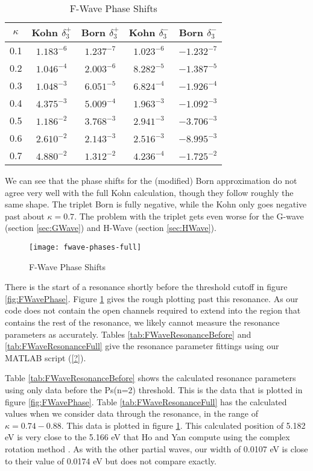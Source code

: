 \documentclass[Dissertation.tex]{subfiles}
\begin{document}
\setlength{\abovecaptionskip}{6pt}
\setlength{\belowcaptionskip}{6pt}
\begin{table}[H]
\centering
\begin{tabular}{c | c c | c c}
\toprule
$\kappa$ & Kohn $\delta_3^+$ & Born $\delta_3^+$ & Kohn $\delta_3^-$ & Born $\delta_3^-$ \\
\midrule
0.1 &	$1.183^{-6}$ & $1.237^{-7}$ & $1.023^{-6}$ & $-1.232^{-7}$ \\
0.2 &	$1.046^{-4}$ & $2.003^{-6}$ & $8.282^{-5}$ & $-1.387^{-5}$ \\
0.3 &	$1.048^{-3}$ & $6.051^{-5}$ & $6.824^{-4}$ & $-1.926^{-4}$ \\
0.4 &	$4.375^{-3}$ & $5.009^{-4}$ & $1.963^{-3}$ & $-1.092^{-3}$ \\
0.5 & $1.186^{-2}$ & $3.768^{-3}$ & $2.941^{-3}$ & $-3.706^{-3}$ \\
0.6 &	$2.610^{-2}$ & $2.143^{-3}$ & $2.516^{-3}$ & $-8.995^{-3}$ \\
0.7 &	$4.880^{-2}$ & $1.312^{-2}$ & $4.236^{-4}$ & $-1.725^{-2}$ \\
\bottomrule
\end{tabular}
\caption{F-Wave Phase Shifts}
\label{tab:FWavePhase}
\end{table}

We can see that the phase shifts for the (modified) Born approximation do not agree very well with the full Kohn calculation, though they follow roughly the same shape. The triplet Born is fully negative, while the Kohn only goes negative past about $\kappa = 0.7$. The problem with the triplet gets even worse for the G-wave (section \ref{sec:GWave}) and H-Wave (section \ref{sec:HWave}).

\begin{figure}[H]
	\centering
	\texttt{[image: fwave-phases-full]}
	\caption{F-Wave Phase Shifts}
	\label{fig:FWavePhaseFull}
\end{figure}

There is the start of a resonance shortly before the threshold cutoff in figure \ref{fig:FWavePhase}. Figure \ref{fig:FWavePhaseFull} gives the rough plotting past this resonance. As our code does not contain the open channels required to extend into the region that contains the rest of the resonance, we likely cannot measure the resonance parameters as accurately. Tables \ref{tab:FWaveResonanceBefore} and \ref{tab:FWaveResonanceFull} give the resonance parameter fittings using our MATLAB script (\ref{?}).

Table \ref{tab:FWaveResonanceBefore} shows the calculated resonance parameters using only data before the Ps(n=2) threshold. This is the data that is plotted in figure \ref{fig:FWavePhase}. Table \ref{tab:FWaveResonanceFull} has the calculated values when we consider data through the resonance, in the range of $\kappa = 0.74 - 0.88$. This data is plotted in figure \ref{fig:FWavePhaseFull}. This calculated position of 5.182 eV is very close to the 5.166 eV that Ho and Yan compute using the complex rotation method \cite{Ho2000}. As with the other partial waves, our width of 0.0107 eV is close to their value of 0.0174 eV but does not compare exactly.
\end{document}

